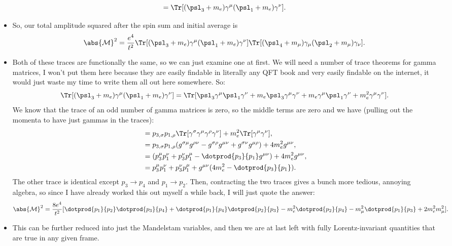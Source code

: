 \begin{itemize}
\begin{equation*}
            [\bar{u}^{(s)}(p_3)\gamma^{\mu}(\psl_{1}+m_e)\gamma^{\nu}u^{(s)}(p_3)] = \Tr[(\psl_{3}+m_e)\gamma^{\mu}(\psl_{1}+m_e)\gamma^{\nu}].
        \end{equation*}
    \item So, our total amplitude squared after the spin sum and initial average is
        \begin{equation*}
            \abs{\mathcal{M}}^2 = \frac{e^4}{t^2} \Tr[(\psl_{3}+m_e)\gamma^{\mu}(\psl_{1}+m_e)\gamma^{\nu}]\Tr[(\psl_{4}+m_{\mu})\gamma_{\mu}(\psl_{2}+m_{\mu})\gamma_{\nu}].
        \end{equation*}
    \item Both of these traces are functionally the same, so we can just examine one at first. We will need a number of trace theorems for gamma matrices, I won't put them here because they are easily findable in literally any QFT book and very easily findable on the internet, it would just waste my time to write them all out here somewhere. So:
        \begin{equation*}
            \Tr[(\psl_{3}+m_e)\gamma^{\mu}(\psl_{1}+m_e)\gamma^{\nu}] = \Tr[\psl_{3}\gamma^{\mu}\psl_{1}\gamma^{\nu} + m_e\psl_{3}\gamma^{\mu}\gamma^{\nu} + m_e\gamma^{\mu}\psl_{1}\gamma^{\nu} + m_e^2\gamma^{\mu}\gamma^{\nu}].
        \end{equation*}
        We know that the trace of an odd number of gamma matrices is zero, so the middle terms are zero and we have (pulling out the momenta to have just gammas in the traces):
        \begin{align*}
            &= p_{3,\sigma}p_{1,\rho}\Tr[\gamma^{\sigma}\gamma^{\mu}\gamma^{\rho}\gamma^{\nu}] + m_e^2\Tr[\gamma^{\mu}\gamma^{\nu}], \\
            &= p_{3,\sigma}p_{1,\rho}(g^{\sigma\mu}g^{\rho\nu} - g^{\sigma\rho}g^{\mu\nu} + g^{\sigma\nu}g^{\mu\rho}) + 4m_e^2g^{\mu\nu}, \\
            &= (p_3^{\mu}p_1^{\nu} + p_3^{\nu}p_1^{\mu} - \dotprod{p_3}{p_1}g^{\mu\nu}) + 4m_e^2g^{\mu\nu}, \\
            &= p_3^{\mu}p_1^{\nu} + p_3^{\nu}p_1^{\mu} + g^{\mu\nu}(4m_e^2 - \dotprod{p_3}{p_1}).
        \end{align*}
        The other trace is identical except $p_3 \rightarrow p_4$ and $p_1 \rightarrow p_2$. Then, contracting the two traces gives a bunch more tedious, annoying algebra, so since I have already worked this out myself a while back, I will just quote the answer:
        \begin{equation*}
            \abs{\mathcal{M}}^2 = \frac{8e^4}{t^2}[\dotprod{p_1}{p_2}\dotprod{p_3}{p_4} + \dotprod{p_1}{p_4}\dotprod{p_2}{p_3} - m_e^2\dotprod{p_2}{p_4} - m_{\mu}^2\dotprod{p_1}{p_3} + 2m_e^2m_{\mu}^2].
        \end{equation*}
    \item This can be further reduced into just the Mandelstam variables, and then we are at last left with fully Lorentz-invariant quantities that are true in any given frame.
\end{itemize}


